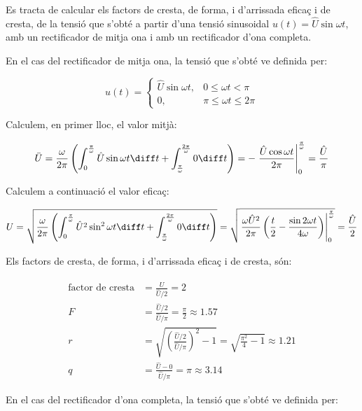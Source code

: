 \begin{exemple}[\FactorsCrestaFormaArr{}]
	\addcontentsxms{\FactorsCrestaFormaArr}
    Es tracta de calcular els factors de cresta, de forma, i d'arrissada eficaç i de cresta,
    de la tensió  que s'obté a partir d'una tensió sinusoidal
    $u(t) = \hat{U} \sin\omega t$, amb un rectificador de mitja ona i
    amb un rectificador d'ona completa.

    En el cas del rectificador de mitja ona, la tensió que s'obté ve
    definida per:
    
    \[
    u(t) = \begin{cases} \hat{U} \sin\omega t, & 0 \leq \omega t < \pi\\
           0, & \pi \leq \omega t \leq 2\pi \end{cases}
    \]

    Calculem, en primer lloc, el valor mitjà:
    
    \[
    \bar{U} = \frac{\omega}{2\pi} \left( \int_0^\frac{\pi}{\omega}
    \hat{U} \sin\omega t \diff t +
    \int_\frac{\pi}{\omega}^\frac{2\pi}{\omega} 0 \diff t \right) = -
    \left. \frac{\hat{U} \cos\omega t}{2\pi}
    \right|_0^\frac{\pi}{\omega} = \frac{\hat{U}}{\pi}
    \]

    Calculem a continuació el valor eficaç:
    
    \[
    U = \sqrt{\frac{\omega}{2\pi} \left( \int_0^\frac{\pi}{\omega}
    \hat{U}^2 \sin^2\omega t \diff t +
    \int_\frac{\pi}{\omega}^\frac{2\pi}{\omega} 0 \diff t \right)} =
      \sqrt{\left.\frac{\omega \hat{U}^2}{2\pi}\left( \frac{t}{2} -
    \frac{\sin 2 \omega t}{4\omega}
    \right)\right|_0^\frac{\pi}{\omega}} = \frac{\hat{U}}{2}
    \]

    Els factors de cresta, de forma, i d'arrissada eficaç i de cresta, són:
    
    \begin{align*}
        \text{factor de cresta} &= \frac{\hat{U}}{\hat{U}/2} = 2 \\[2ex]
        F &= \frac{\hat{U}/2}{\hat{U}/\pi} =\frac{\pi}{2} \approx
        \num{1,57} \\[2ex]
        r &= \sqrt{\left(\frac{\hat{U}/2}{\hat{U}/\pi}\right)^2-1} =
    \sqrt{\frac{\pi^2}{4}-1} \approx \num{1,21} \\[21ex]
        q &= \frac{\hat{U} - 0}{\hat{U}/\pi} = \pi \approx \num{3,14}
    \end{align*}


    En el cas del rectificador d'ona completa, la tensió que s'obté ve
    definida per:
    

\end{exemple}
